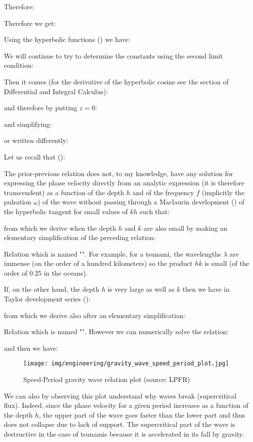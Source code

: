 	Therefore:
	
	Therefore we get:
	
	Using the hyperbolic functions () we have:
	
	We will continue to try to determine the constants using the second limit condition:
	
	Then it comes (for the derivative of the hyperbolic cosine see the section of Differential and Integral Calculus):
	
	and therefore by putting $z=0$:
	
	and simplifying:
	
	or written differently:
	
	Let us recall that ():
	
	The prior-previous relation does not, to my knowledge, have any solution for expressing the phase velocity directly from an analytic expression (it is therefore transcendent) as a function of the depth $h$ and of the frequency $f$ (implicitly the pulsation $\omega$) of the wave without passing through a Maclaurin development () of the hyperbolic tangent for small values of $kh$ such that:
	
	from which we derive when the depth $h$ and $k$ are also small by making an elementary simplification of the preceding relation:
	
	Relation which is named "". For example, for a tsunami, the wavelengths $\lambda$ are immense (on the order of a hundred kilometers) so the product $hk$ is small (of the order of $0.25$ in the oceans).

	If, on the other hand, the depth $h$ is very large as well as $k$ then we have in Taylor development  series ():
	
	from which we derive also after an elementary simplification:
	
	Relation which is named "".
	However we can numerically solve the relation:
	
	and then we have:
	\begin{figure}[H]
		\centering
		\texttt{[image: img/engineering/gravity\_wave\_speed\_period\_plot.jpg]}	
		\caption[Speed-Period gravity wave relation plot]{Speed-Period gravity wave relation plot (source: LPFR)}
	\end{figure}
	We can also by observing this plot understand why waves break (supercritical flux). Indeed, since the phase velocity for a given period increases as a function of the depth $h$, the upper part of the wave goes faster than the lower part and thus does not collapse due to lack of support. The supercritical part of the wave is destructive in the case of tsunamis because it is accelerated in its fall by gravity.

